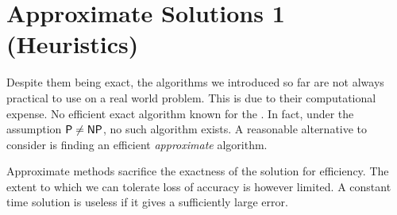 \chapter{Approximate Solutions 1 (Heuristics)}

Despite them being exact, the algorithms we introduced so far are not always practical to use on a real world problem. This is due to their computational expense. No efficient exact algorithm known for the \TSP. In fact, under the assumption \(\textsf{P}\neq\textsf{NP}\), no such algorithm exists. A reasonable alternative to consider is finding an efficient \emph{approximate} algorithm.

Approximate methods sacrifice the exactness of the solution for efficiency. The extent to which we can tolerate loss of accuracy is however limited. A constant time solution is useless if it gives a sufficiently large error.


